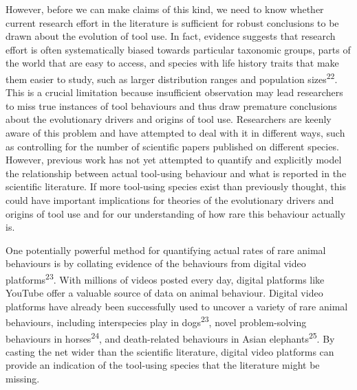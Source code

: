 \documentclass[
  man, donotrepeattitle,floatsintext]{apa6}
\begin{document}
However, before we can make claims of this kind, we need to know whether current
research effort in the literature is sufficient for robust conclusions to be
drawn about the evolution of tool use. In fact, evidence suggests that research
effort is often systematically biased towards particular taxonomic groups, parts
of the world that are easy to access, and species with life history traits that
make them easier to study, such as larger distribution ranges and population
sizes\textsuperscript{22}. This is a crucial limitation because insufficient
observation may lead researchers to miss true instances of tool behaviours and
thus draw premature conclusions about the evolutionary drivers and origins of
tool use. Researchers are keenly aware of this problem and have attempted to
deal with it in different ways, such as controlling for the number of scientific
papers published on different species. However, previous work has not yet
attempted to quantify and explicitly model the relationship between actual
tool-using behaviour and what is reported in the scientific literature. If more
tool-using species exist than previously thought, this could have important
implications for theories of the evolutionary drivers and origins of tool use
and for our understanding of how rare this behaviour actually is.

One potentially powerful method for quantifying actual rates of rare animal
behaviours is by collating evidence of the behaviours from digital video
platforms\textsuperscript{23}. With millions of videos posted every day, digital
platforms like YouTube offer a valuable source of data on animal behaviour.
Digital video platforms have already been successfully used to uncover a variety
of rare animal behaviours, including interspecies play in dogs\textsuperscript{23},
novel problem-solving behaviours in horses\textsuperscript{24}, and death-related
behaviours in Asian elephants\textsuperscript{25}. By casting the net wider than the
scientific literature, digital video platforms can provide an indication of the
tool-using species that the literature might be missing.
\end{document}
